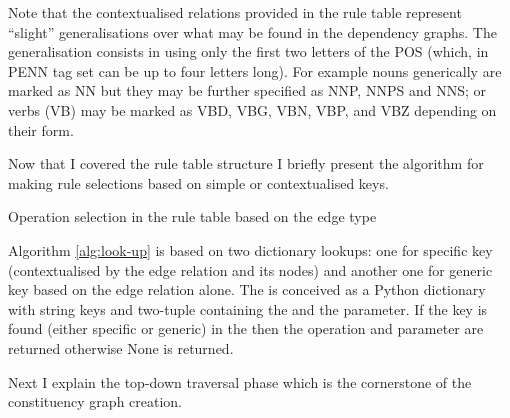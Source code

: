     Note that the contextualised relations provided in the rule table represent ``slight'' generalisations over what may be found in the dependency graphs. The generalisation consists in using only the first two letters of the POS (which, in PENN tag set can be up to four letters long). For example nouns generically are marked as NN but they may be further specified as NNP, NNPS and NNS; or verbs (VB) may be marked as VBD, VBG, VBN, VBP, and VBZ depending on their form. 

    Now that I covered the rule table structure I briefly present the algorithm for making rule selections based on simple or contextualised keys.  

    \begin{algorithm}[!ht]
        \Input{ \rt, \edge}
        \Output{ \rrule}
        \caption{Operation selection in the rule table based on the edge type}
        \label{alg:look-up}
    \end{algorithm}

    Algorithm \ref{alg:look-up} is based on two dictionary lookups: one for specific key (contextualised by the edge relation and its nodes) and another one for generic key based on the edge relation alone. The \rt is conceived as a Python dictionary with string keys and two-tuple containing the \operation and the \elementType parameter. If the key is found (either specific or generic) in the \rt then the operation and parameter are returned otherwise None is returned. 

    Next I explain the top-down traversal phase which is the cornerstone of the constituency graph creation. 

